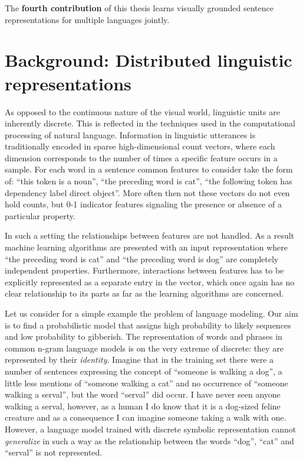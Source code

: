 The \textbf{fourth contribution} of this thesis learns visually grounded sentence representations for 
multiple languages jointly. 




\section{Background: Distributed linguistic representations}
\label{introducion}
As opposed to the continuous nature of the visual world, linguistic units
are inherently discrete. This is reflected in the techniques used in the
computational processing of natural language.
Information in linguistic utterances is traditionally encoded
in sparse high-dimensional count vectors, where each
dimension corresponds to the number of times a specific feature occurs in a
sample. For each word in a sentence common features to consider take the form of:
``this token is a noun'', ``the preceding word is cat'',
``the following token has dependency label direct object''.
More often then not these vectors do not even hold counts, but 0-1
indicator features signaling the presence or absence of a particular property.

In such a setting the relationships between features are not handled.
As a result machine learning algorithms are presented with an input representation where
``the preceding word is cat'' and ``the preceding word is dog''
are completely independent properties.
Furthermore, interactions between features has to be
explicitly represented as a separate entry in the vector, which once again has
no clear relationship to its parts as far as the learning algorithms are concerned.

Let us consider for a simple example the problem of language modeling.
Our  aim is to find a probabilistic model
that assigns high probability to likely sequences and low probability to gibberish.
The representation of words and phrases in common n-gram language models is on the
very extreme of discrete: they are represented by their \emph{identity}.
Imagine that in the training set there were a number of sentences expressing the concept
of ``someone is walking a dog'', a little less mentions of ``someone walking a cat''
and no occurrence of ``someone walking a serval'', but the word ``serval'' did occur.
I have never seen anyone walking a serval, however, as a human I do know that it is a dog-sized
feline creature and as a consequence I can imagine someone taking a walk with one.
However, a language model trained with discrete symbolic representation cannot
\emph{generalize} in such a way as the
relationship between the words ``dog'', ``cat'' and ``serval'' is not represented.

